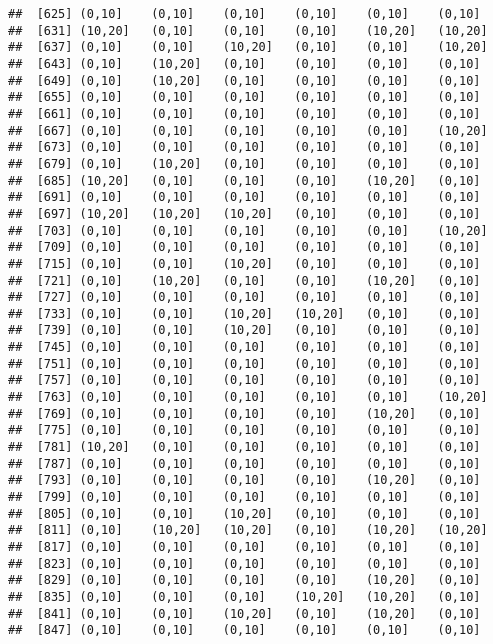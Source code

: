 \documentclass[]{article}
\begin{document}
\begin{verbatim}
##  [625] (0,10]    (0,10]    (0,10]    (0,10]    (0,10]    (0,10]   
##  [631] (10,20]   (0,10]    (0,10]    (0,10]    (10,20]   (10,20]  
##  [637] (0,10]    (0,10]    (10,20]   (0,10]    (0,10]    (10,20]  
##  [643] (0,10]    (10,20]   (0,10]    (0,10]    (0,10]    (0,10]   
##  [649] (0,10]    (10,20]   (0,10]    (0,10]    (0,10]    (0,10]   
##  [655] (0,10]    (0,10]    (0,10]    (0,10]    (0,10]    (0,10]   
##  [661] (0,10]    (0,10]    (0,10]    (0,10]    (0,10]    (0,10]   
##  [667] (0,10]    (0,10]    (0,10]    (0,10]    (0,10]    (10,20]  
##  [673] (0,10]    (0,10]    (0,10]    (0,10]    (0,10]    (0,10]   
##  [679] (0,10]    (10,20]   (0,10]    (0,10]    (0,10]    (0,10]   
##  [685] (10,20]   (0,10]    (0,10]    (0,10]    (10,20]   (0,10]   
##  [691] (0,10]    (0,10]    (0,10]    (0,10]    (0,10]    (0,10]   
##  [697] (10,20]   (10,20]   (10,20]   (0,10]    (0,10]    (0,10]   
##  [703] (0,10]    (0,10]    (0,10]    (0,10]    (0,10]    (10,20]  
##  [709] (0,10]    (0,10]    (0,10]    (0,10]    (0,10]    (0,10]   
##  [715] (0,10]    (0,10]    (10,20]   (0,10]    (0,10]    (0,10]   
##  [721] (0,10]    (10,20]   (0,10]    (0,10]    (10,20]   (0,10]   
##  [727] (0,10]    (0,10]    (0,10]    (0,10]    (0,10]    (0,10]   
##  [733] (0,10]    (0,10]    (10,20]   (10,20]   (0,10]    (0,10]   
##  [739] (0,10]    (0,10]    (10,20]   (0,10]    (0,10]    (0,10]   
##  [745] (0,10]    (0,10]    (0,10]    (0,10]    (0,10]    (0,10]   
##  [751] (0,10]    (0,10]    (0,10]    (0,10]    (0,10]    (0,10]   
##  [757] (0,10]    (0,10]    (0,10]    (0,10]    (0,10]    (0,10]   
##  [763] (0,10]    (0,10]    (0,10]    (0,10]    (0,10]    (10,20]  
##  [769] (0,10]    (0,10]    (0,10]    (0,10]    (10,20]   (0,10]   
##  [775] (0,10]    (0,10]    (0,10]    (0,10]    (0,10]    (0,10]   
##  [781] (10,20]   (0,10]    (0,10]    (0,10]    (0,10]    (0,10]   
##  [787] (0,10]    (0,10]    (0,10]    (0,10]    (0,10]    (0,10]   
##  [793] (0,10]    (0,10]    (0,10]    (0,10]    (10,20]   (0,10]   
##  [799] (0,10]    (0,10]    (0,10]    (0,10]    (0,10]    (0,10]   
##  [805] (0,10]    (0,10]    (10,20]   (0,10]    (0,10]    (0,10]   
##  [811] (0,10]    (10,20]   (10,20]   (0,10]    (10,20]   (10,20]  
##  [817] (0,10]    (0,10]    (0,10]    (0,10]    (0,10]    (0,10]   
##  [823] (0,10]    (0,10]    (0,10]    (0,10]    (0,10]    (0,10]   
##  [829] (0,10]    (0,10]    (0,10]    (0,10]    (10,20]   (0,10]   
##  [835] (0,10]    (0,10]    (0,10]    (10,20]   (10,20]   (0,10]   
##  [841] (0,10]    (0,10]    (10,20]   (0,10]    (10,20]   (0,10]   
##  [847] (0,10]    (0,10]    (0,10]    (0,10]    (0,10]    (0,10]   

\end{verbatim}
\end{document}
